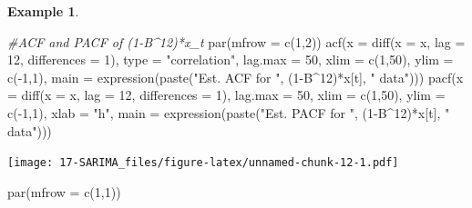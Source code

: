 \documentclass[
]{book}
\newenvironment{Shaded}{\begin{snugshade}}{\end{snugshade}}
\newcommand{\AttributeTok}[1]{\textcolor[rgb]{0.77,0.63,0.00}{#1}}
\newcommand{\CommentTok}[1]{\textcolor[rgb]{0.56,0.35,0.01}{\textit{#1}}}
\newcommand{\DecValTok}[1]{\textcolor[rgb]{0.00,0.00,0.81}{#1}}
\newcommand{\FunctionTok}[1]{\textcolor[rgb]{0.00,0.00,0.00}{#1}}
\newcommand{\NormalTok}[1]{#1}
\newcommand{\SpecialCharTok}[1]{\textcolor[rgb]{0.00,0.00,0.00}{#1}}
\newcommand{\StringTok}[1]{\textcolor[rgb]{0.31,0.60,0.02}{#1}}
\theoremstyle{definition}
\theoremstyle{definition}
\newtheorem{example}{Example}[chapter]
\theoremstyle{definition}
\theoremstyle{definition}
\theoremstyle{remark}
\begin{document}
\begin{example}
\begin{Shaded}
\begin{Highlighting}[]
\CommentTok{\#ACF and PACF of (1{-}B\^{}12)*x\_t}
  \FunctionTok{par}\NormalTok{(}\AttributeTok{mfrow =} \FunctionTok{c}\NormalTok{(}\DecValTok{1}\NormalTok{,}\DecValTok{2}\NormalTok{))}
  \FunctionTok{acf}\NormalTok{(}\AttributeTok{x =} \FunctionTok{diff}\NormalTok{(}\AttributeTok{x =}\NormalTok{ x, }\AttributeTok{lag =} \DecValTok{12}\NormalTok{, }\AttributeTok{differences =} \DecValTok{1}\NormalTok{), }\AttributeTok{type =} \StringTok{"correlation"}\NormalTok{, }\AttributeTok{lag.max =} \DecValTok{50}\NormalTok{, }\AttributeTok{xlim =} \FunctionTok{c}\NormalTok{(}\DecValTok{1}\NormalTok{,}\DecValTok{50}\NormalTok{), }
      \AttributeTok{ylim =} \FunctionTok{c}\NormalTok{(}\SpecialCharTok{{-}}\DecValTok{1}\NormalTok{,}\DecValTok{1}\NormalTok{), }\AttributeTok{main =} \FunctionTok{expression}\NormalTok{(}\FunctionTok{paste}\NormalTok{(}\StringTok{"Est. ACF for "}\NormalTok{, (}\DecValTok{1}\SpecialCharTok{{-}}\NormalTok{B}\SpecialCharTok{\^{}}\DecValTok{12}\NormalTok{)}\SpecialCharTok{*}\NormalTok{x[t], }\StringTok{" data"}\NormalTok{)))}
  \FunctionTok{pacf}\NormalTok{(}\AttributeTok{x =} \FunctionTok{diff}\NormalTok{(}\AttributeTok{x =}\NormalTok{ x, }\AttributeTok{lag =} \DecValTok{12}\NormalTok{, }\AttributeTok{differences =} \DecValTok{1}\NormalTok{), }\AttributeTok{lag.max =} \DecValTok{50}\NormalTok{, }\AttributeTok{xlim =} \FunctionTok{c}\NormalTok{(}\DecValTok{1}\NormalTok{,}\DecValTok{50}\NormalTok{), }\AttributeTok{ylim =} \FunctionTok{c}\NormalTok{(}\SpecialCharTok{{-}}\DecValTok{1}\NormalTok{,}\DecValTok{1}\NormalTok{), }\AttributeTok{xlab =} \StringTok{"h"}\NormalTok{, }
       \AttributeTok{main =} \FunctionTok{expression}\NormalTok{(}\FunctionTok{paste}\NormalTok{(}\StringTok{"Est. PACF for "}\NormalTok{, (}\DecValTok{1}\SpecialCharTok{{-}}\NormalTok{B}\SpecialCharTok{\^{}}\DecValTok{12}\NormalTok{)}\SpecialCharTok{*}\NormalTok{x[t], }\StringTok{" data"}\NormalTok{)))}
\end{Highlighting}
\end{Shaded}

\texttt{[image: 17-SARIMA\_files/figure-latex/unnamed-chunk-12-1.pdf]}

\begin{Shaded}
\begin{Highlighting}[]
  \FunctionTok{par}\NormalTok{(}\AttributeTok{mfrow =} \FunctionTok{c}\NormalTok{(}\DecValTok{1}\NormalTok{,}\DecValTok{1}\NormalTok{))}
\end{Highlighting}
\end{Shaded}


\end{example}
\end{document}
